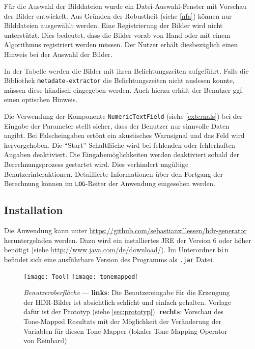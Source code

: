 Für die Auswahl der Bilddateien wurde ein Datei-Auswahl-Fenster mit Vorschau der Bilder entwickelt. Aus Gründen der Robustheit (siehe \autoref{nfa}) können nur Bilddateien ausgewählt werden.  Eine Registrierung der Bilder wird nicht unterstützt. Dies bedeutet, dass die Bilder vorab von Hand oder mit einem Algorithmus registriert werden müssen. Der Nutzer erhält diesbezüglich einen Hinweis bei der Auswahl der Bilder.

In der Tabelle werden die Bilder mit ihren Belichtungszeiten aufgeführt. Falls die Bibliothek \texttt{metadate-extractor} die Belichtungszeiten nicht auslesen konnte, müssen diese händisch eingegeben werden. Auch hierzu erhält der Benutzer ggf. einen optischen Hinweis.

Die Verwendung der Komponente \texttt{NumericTextField} (siehe \autoref{externals}) bei der Eingabe der Parameter stellt sicher, dass der Benutzer nur sinnvolle Daten angibt. Bei Falscheingaben ertönt ein akustisches Warnsignal und das Feld wird hervorgehoben. Die \enquote{Start} Schaltfläche wird bei fehlenden oder fehlerhaften Angaben deaktiviert. Die Eingabemöglichkeiten werden deaktiviert sobald der Berechnungsprozess gestartet wird. Dies verhindert ungültige Benutzerinteraktionen. Detaillierte Informationen über den Fortgang der Berechnung können im \texttt{LOG}-Reiter der Anwendung eingesehen werden.

\subsection{Installation}

Die Anwendung kann unter \url{https://github.com/sebastianzillessen/hdr-generator} heruntergeladen werden. Dazu wird ein installiertes \gls{JRE} der Version 6 oder höher benötigt (siehe \url{http://www.java.com/de/download/}). Im Unterordner \texttt{bin} befindet sich eine ausführbare Version des Programms als \texttt{.jar} Datei.  

\begin{figure}
  \begin{center}
    \texttt{[image: Tool]}\hfill
    \texttt{[image: tonemapped]}
    \caption{\textit{Benutzeroberfläche} --- \textbf{links}: Die Benutzereingabe für die Erzeugung der HDR-Bilder ist absichtlich schlicht und einfach gehalten. Vorlage dafür ist der Prototyp (siehe \autoref{sec:prototyp}). \textbf{rechts}: Vorschau des Tone-Mapped Resultats mit der Möglichkeit der Veränderung der Variablen für diesen Tone-Mapper (lokaler \gls{Tone-Mapping}-Operator von Reinhard)}
    \label{fig:tool}
    \label{fig:app:tone}
  \end{center}
\end{figure}


